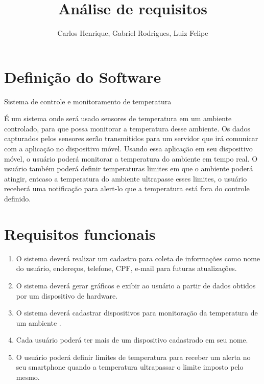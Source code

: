 \documentclass[11pt]{article}
\begin{document}
%
\author{Carlos Henrique, Gabriel Rodrigues, Luiz Felipe }
\title{Análise de requisitos}
\maketitle

\section{Defini\c{c}\~ao do Software}


\begin{center}
Sistema de controle e monitoramento de temperatura
\end{center}

\'E um sistema onde será usado sensores de temperatura em um ambiente controlado, para que possa monitorar a temperatura desse ambiente. Os dados capturados pelos sensores ser\~ão transmitidos para um servidor que ir\'a comunicar com a aplicação no dispositivo móvel. Usando essa aplicação em seu dispositivo móvel, o usuário poderá monitorar a temperatura do ambiente em tempo real. O usu\'ario tamb\'em poder\'a definir temperaturas limites em que o ambiente poder\'a atingir, ent caso a temperatura do ambiente ultrapasse esses limites, o usuário receberá uma notificação para alert\á-lo que a temperatura est\'a fora do controle definido.




\section{Requisitos funcionais}

\begin{enumerate}
    \item O sistema dever\'a realizar um cadastro para coleta de informa\c{c}\~oes como nome do usu\'ario, endere\c{c}os, telefone, CPF, e-mail para futuras atualiza\c{c}\~oes.
    \item O sistema dever\'a gerar gráficos e exibir ao usu\'ario a partir de dados obtidos por um dispositivo de hardware.
    \item O sistema deverá cadastrar dispositivos para monitoração da temperatura de um ambiente . 
    \item Cada usuário poderá ter mais de um dispositivo cadastrado em seu nome.
    \item O usuário poderá definir limites de temperatura para receber um alerta no seu smartphone quando a temperatura ultrapassar o limite imposto pelo mesmo.

\end{enumerate}
\end{document}
